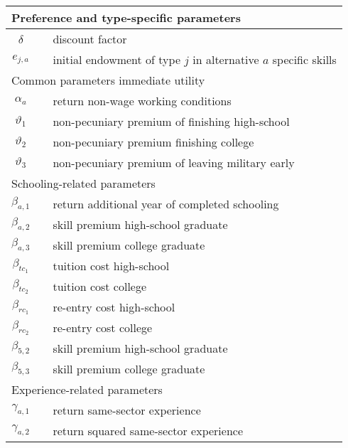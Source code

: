 \begin{ThreePartTable}
\begin{longtable}{@{}cll@{}}
\midrule
\multicolumn{3}{l}{Preference and type-specific parameters}																		 \\ \midrule
$\delta$ 				&  & discount factor																			  \\
$e_{j, a}$			&  & initial endowment of type $j$ in alternative $a$ specific skills 	  \\ [7.5pt] \midrule
\multicolumn{3}{l}{Common parameters immediate utility}												\\ \midrule
$\alpha_a$           &  & return non-wage working conditions		   \\
$\vartheta_1$        &  & non-pecuniary premium of finishing high-school                 								    \\
$\vartheta_2$        &  & non-pecuniary premium finishing college															    \\
$\vartheta_3$        &  & non-pecuniary premium of leaving military early						  \\[7.5pt] \midrule
\multicolumn{3}{l}{Schooling-related parameters}															   \\ \midrule
$\beta_{a,1}$        &  & return additional year of completed schooling 								\\
$\beta_{a,2}$        &  & skill premium high-school graduate										      \\
$\beta_{a,3}$        &  & skill premium college graduate													   	\\
$\beta_{tc_1}$       &  & tuition cost high-school                      											\\
$\beta_{tc_2}$       &  & tuition cost college                          												\\
$\beta_{rc_1}$       &  & re-entry cost high-school                     										   \\
$\beta_{rc_2}$       &  & re-entry cost college                        												   \\
$\beta_{5,2}$        &  & skill premium high-school graduate            									\\
$\beta_{5,3}$        &  & skill premium college graduate                									     \\ [7.5pt] \midrule
\multicolumn{3}{l}{Experience-related parameters}           													 \\
\midrule
$\gamma_{a,1}$       &  & return same-sector experience                 									 \\
$\gamma_{a,2}$       &  & return squared same-sector experience         								\\

\end{longtable}
\end{ThreePartTable}
